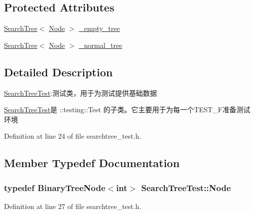 \subsection*{Protected Attributes}
\begin{DoxyCompactItemize}
\item 
\hyperlink{class_introduction_to_algorithm_1_1_tree_algorithm_1_1_search_tree}{Search\+Tree}$<$ \hyperlink{class_search_tree_test_a921d5813f947eb9b70417b69722bc050}{Node} $>$ \hyperlink{class_search_tree_test_a08832932ab11e000dcd1ba60da8bad5f}{\+\_\+empty\+\_\+tree}
\item 
\hyperlink{class_introduction_to_algorithm_1_1_tree_algorithm_1_1_search_tree}{Search\+Tree}$<$ \hyperlink{class_search_tree_test_a921d5813f947eb9b70417b69722bc050}{Node} $>$ \hyperlink{class_search_tree_test_a9982df0c932b171ff29dfe7abcebdc05}{\+\_\+normal\+\_\+tree}
\end{DoxyCompactItemize}


\subsection{Detailed Description}
\hyperlink{class_search_tree_test}{Search\+Tree\+Test}\+:测试类，用于为测试提供基础数据 

{\ttfamily \hyperlink{class_search_tree_test}{Search\+Tree\+Test}}是 {\ttfamily \+::testing\+::\+Test} 的子类。它主要用于为每一个{\ttfamily T\+E\+S\+T\+\_\+\+F}准备测试环境 

Definition at line 24 of file searchtree\+\_\+test.\+h.



\subsection{Member Typedef Documentation}
\hypertarget{class_search_tree_test_a921d5813f947eb9b70417b69722bc050}{}
\subsubsection[{Node}]{\setlength{\rightskip}{0pt plus 5cm}typedef {\bf Binary\+Tree\+Node}$<$int$>$ {\bf Search\+Tree\+Test\+::\+Node}}\label{class_search_tree_test_a921d5813f947eb9b70417b69722bc050}


Definition at line 27 of file searchtree\+\_\+test.\+h.



